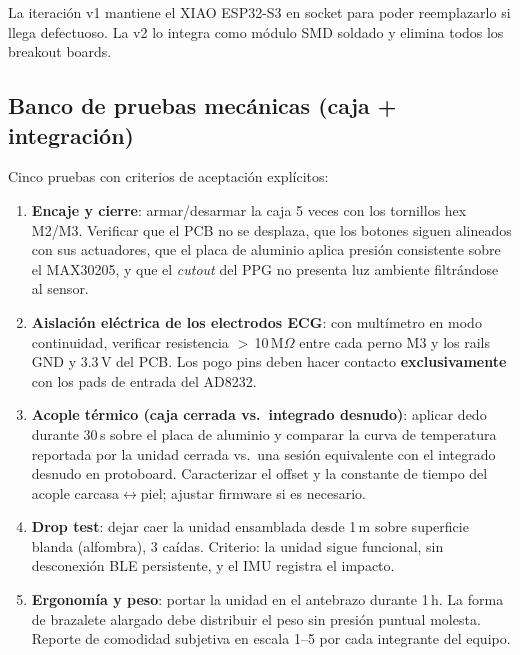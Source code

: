 \documentclass[letterpaper,11pt]{article}
\begin{document}
La iteración v1 mantiene el XIAO ESP32-S3 en socket para poder reemplazarlo si llega
defectuoso. La v2 lo integra como módulo SMD soldado y elimina todos los breakout boards.

\subsection{Banco de pruebas mecánicas (caja + integración)}
\label{sec:pruebas_mec}
Cinco pruebas con criterios de aceptación explícitos:

\begin{enumerate}
    \item \textbf{Encaje y cierre}: armar/desarmar la caja 5 veces con los tornillos hex
    M2/M3. Verificar que el PCB no se desplaza, que los botones siguen alineados con sus
    actuadores, que el placa de aluminio aplica presión consistente sobre el MAX30205, y que
    el \textit{cutout} del PPG no presenta luz ambiente filtrándose al sensor.

    \item \textbf{Aislación eléctrica de los electrodos ECG}: con multímetro en modo
    continuidad, verificar resistencia $>$\,10\,M$\Omega$ entre cada perno M3 y los rails
    GND y 3.3\,V del PCB. Los pogo pins deben hacer contacto \textbf{exclusivamente} con los
    pads de entrada del AD8232.

    \item \textbf{Acople térmico (caja cerrada vs.\ integrado desnudo)}: aplicar dedo durante 30\,s
    sobre el placa de aluminio y comparar la curva de temperatura reportada por la unidad
    cerrada vs.\ una sesión equivalente con el integrado desnudo en protoboard. Caracterizar el
    offset y la constante de tiempo del acople carcasa$\leftrightarrow$piel; ajustar firmware
    si es necesario.

    \item \textbf{Drop test}: dejar caer la unidad ensamblada desde 1\,m sobre superficie
    blanda (alfombra), 3 caídas. Criterio: la unidad sigue funcional, sin desconexión BLE
    persistente, y el IMU registra el impacto.

    \item \textbf{Ergonomía y peso}: portar la unidad en el antebrazo durante 1\,h. La forma
    de brazalete alargado debe distribuir el peso sin presión puntual molesta. Reporte de
    comodidad subjetiva en escala 1--5 por cada integrante del equipo.
\end{enumerate}
\end{document}
